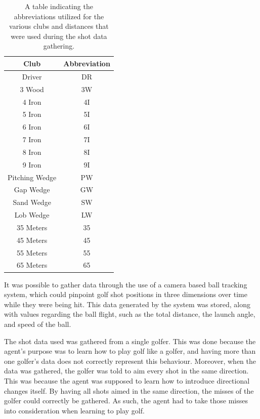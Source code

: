 \documentclass{kththesis}
\begin{document}
\begin{table}
    \centering
    \begin{tabular}{|c| c|}
        \hline
        \textbf{Club} & \textbf{Abbreviation} \\ \hline
        Driver & DR \\ \hline
        3 Wood & 3W \\ \hline 
        4 Iron & 4I \\ \hline 
        5 Iron & 5I \\ \hline 
        6 Iron & 6I \\ \hline 
        7 Iron & 7I \\ \hline 
        8 Iron & 8I \\ \hline 
        9 Iron & 9I \\ \hline 
        Pitching Wedge & PW \\ \hline 
        Gap Wedge & GW \\ \hline 
        Sand Wedge & SW \\ \hline 
        Lob Wedge & LW \\ \hline 
        35 Meters & 35 \\ \hline 
        45 Meters & 45 \\ \hline 
        55 Meters & 55 \\ \hline 
        65 Meters & 65 \\ \hline 
    \end{tabular}
    \caption{A table indicating the abbreviations utilized for the various clubs and distances that were used during the shot data gathering.}
    \label{tab:clubabbreviations}
\end{table}

It was possible to gather data through the use of a camera based ball tracking system, which could pinpoint golf shot positions in three dimensions over time while they were being hit. This data generated by the system was stored, along with values regarding the ball flight, such as the total distance, the launch angle, and speed of the ball. 

The shot data used was gathered from a single golfer. This was done because the agent's purpose was to learn how to play golf like a golfer, and having more than one golfer's data does not correctly represent this behaviour. Moreover, when the data was gathered, the golfer was told to aim every shot in the same direction. This was because the agent was supposed to learn how to introduce directional changes itself. By having all shots aimed in the same direction, the misses of the golfer could correctly be gathered. As such, the agent had to take those misses into consideration when learning to play golf.
\end{document}
